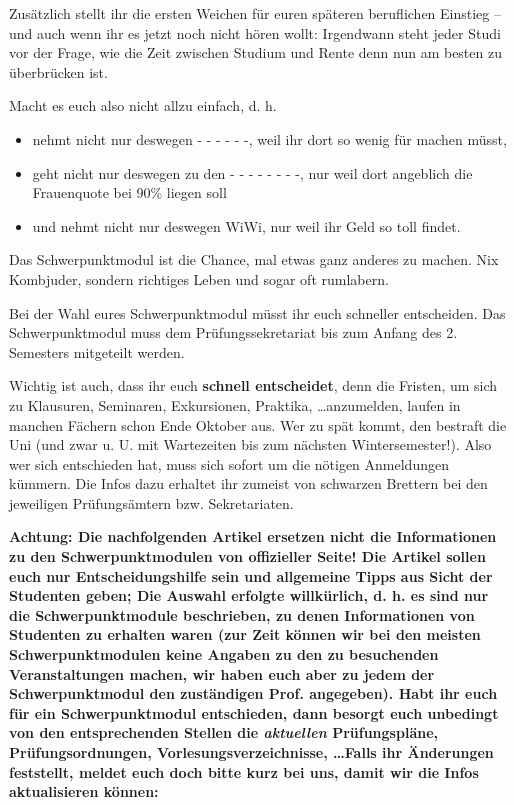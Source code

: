 Zusätzlich stellt ihr die ersten Weichen für euren späteren
  beruf\/lichen Einstieg -- und auch wenn ihr es jetzt noch nicht hören
  wollt: Irgendwann steht jeder Studi vor der Frage, wie die Zeit
  zwischen Studium und Rente denn nun am besten zu überbrücken ist.

Macht es euch also nicht allzu einfach, d. h.

\begin{itemize}

\item nehmt nicht nur deswegen - - - - - -, weil ihr dort so wenig für machen müsst,

\item geht nicht nur deswegen zu den - - - - - - - -, nur weil dort
   angeblich die Frauenquote bei 90\% liegen soll

\item und nehmt nicht nur deswegen WiWi, nur weil ihr Geld so toll findet.

\end{itemize}

Das Schwerpunktmodul ist die Chance, mal etwas ganz anderes zu machen.  Nix
  Kombjuder, sondern richtiges Leben und sogar oft rumlabern.

Bei der Wahl eures Schwerpunktmodul müsst ihr euch schneller entscheiden. Das Schwerpunktmodul muss dem Prüfungssekretariat bis zum Anfang des 2. Semesters mitgeteilt werden. 

Wichtig ist auch, dass ihr euch \textbf{schnell entscheidet}, denn die
  Fristen, um sich zu Klausuren, Seminaren, Exkursionen, Praktika,
  \dots anzumelden, laufen in manchen Fächern schon Ende Oktober aus.
  Wer zu spät kommt, den bestraft die Uni (und zwar u. U. mit
  Wartezeiten bis zum nächsten Wintersemester!).  Also wer sich
  entschieden hat, muss sich sofort um die nötigen Anmeldungen
  kümmern.  Die Infos dazu erhaltet ihr zumeist von schwarzen Brettern
  bei den jeweiligen Prüfungsämtern bzw. Sekretariaten.

\textbf{Achtung: Die nachfolgenden Artikel ersetzen nicht die
  Informationen zu den Schwerpunktmodulen von offizieller Seite!  Die Artikel
  sollen euch nur Entscheidungshilfe sein und allgemeine Tipps aus Sicht
  der Studenten geben;  Die Auswahl erfolgte willkürlich, d. h. es sind
  nur die Schwerpunktmodule beschrieben, zu denen Informationen von
  Studenten zu erhalten waren (zur Zeit können wir bei den meisten Schwerpunktmodulen keine Angaben zu den zu besuchenden Veranstaltungen machen, wir haben euch aber zu jedem der Schwerpunktmodul den zuständigen Prof. angegeben). Habt ihr euch für ein Schwerpunktmodul
  entschieden, dann besorgt euch unbedingt von den entsprechenden
  Stellen die \emph{aktuellen} Prüfungspläne, Prüfungsordnungen,
  Vorlesungsverzeichnisse, \dots Falls ihr Änderungen
  feststellt, meldet euch doch bitte kurz bei uns, damit wir die Infos
  aktualisieren können: }

